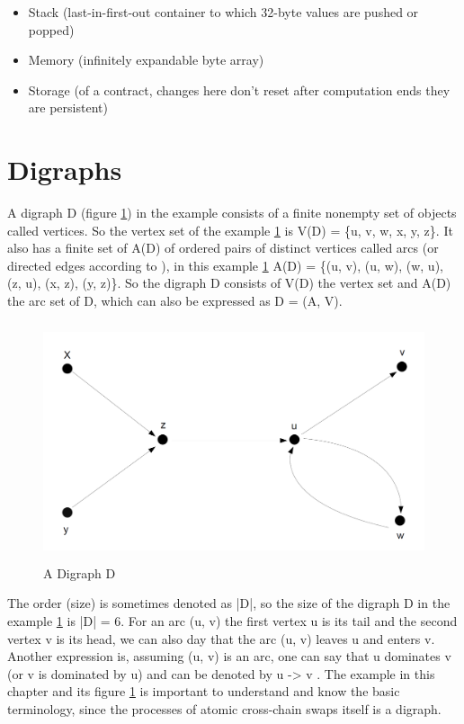 \begin{itemize}
	\item Stack (last-in-first-out container to which 32-byte values are pushed or popped)
	\item Memory (infinitely expandable byte array)
	\item Storage (of a contract, changes here don't reset after computation ends they are persistent)
\end{itemize}


\clearpage


\section{Digraphs}
\label{sec:background:second_section}
A \ac{digraph} D (figure \ref{fig:a_digraph_d}) in the example consists of a finite nonempty set of objects called vertices. So the vertex set of the example \ref{fig:a_digraph_d} is V(D) = \{u, v, w, x, y, z\}. It also has a finite set of A(D) of ordered pairs of distinct vertices called arcs (or directed edges according to \cite{chartrand2010graphs}), in this example \ref{fig:a_digraph_d} A(D) = \{(u, v), (u, w), (w, u), (z, u), (x, z), (y, z)\}. So the \ac{digraph} D consists of V(D) the vertex set and A(D) the arc set of D, which can also be expressed as D = (A, V). \newline



\begin{figure}[h]
	\includegraphics[height=7cm]{adigraphd}	%
	\caption{A Digraph D}
	\label{fig:a_digraph_d}
\end{figure}


The order (size) is sometimes denoted as |D|, so the size of the \ac{digraph} D in the example \ref{fig:a_digraph_d} is |D| = 6. For an arc (u, v) the first vertex u is its tail and the second vertex v is its head, we can also day that the arc (u, v) leaves u and enters v. Another expression is, assuming (u, v) is an arc, one can say that u dominates v (or v is dominated by u) and can be denoted by u -> v \cite{bang2007theory}. The example in this chapter and its figure \ref{fig:a_digraph_d} is important to understand and know the basic terminology, since the processes of atomic cross-chain swaps itself is a \ac{digraph}.


